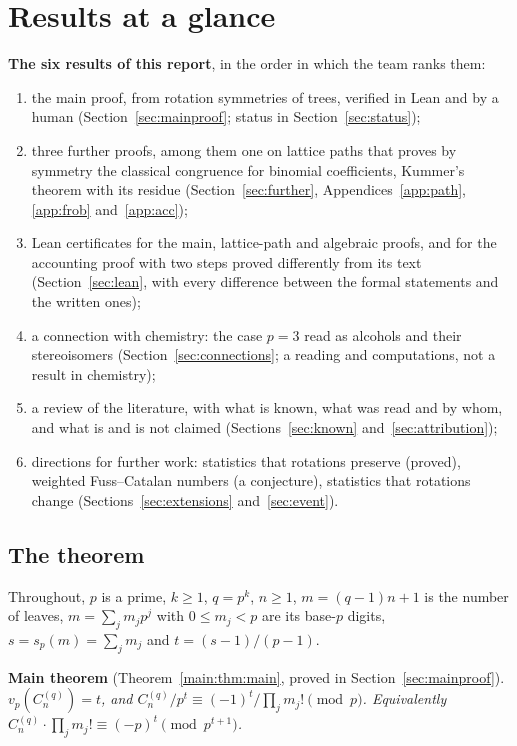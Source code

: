 \documentclass[11pt]{article}
\theoremstyle{definition}
\theoremstyle{remark}
\numberwithin{equation}{section}
\numberwithin{figure}{section}
\begin{document}
\section{Results at a glance}\label{sec:results}
\noindent\textbf{The six results of this report}, in the order in which the team ranks them:
\begin{enumerate}[itemsep=0pt,topsep=2pt]
\item the main proof, from rotation symmetries of trees, verified in Lean and by a human
 (Section~\ref{sec:mainproof}; status in Section~\ref{sec:status});
\item three further proofs, among them one on lattice paths that proves by symmetry the classical congruence
 for binomial coefficients, Kummer's theorem with its residue (Section~\ref{sec:further},
 Appendices~\ref{app:path}, \ref{app:frob} and~\ref{app:acc});
\item Lean certificates for the main, lattice-path and algebraic proofs, and for the accounting proof with two
 steps proved differently from its text (Section~\ref{sec:lean}, with every difference between the formal
 statements and the written ones);
\item a connection with chemistry: the case $p=3$ read as alcohols and their stereoisomers
 (Section~\ref{sec:connections}; a reading and computations, not a result in chemistry);
\item a review of the literature, with what is known, what was read and by whom, and what is and is not claimed
 (Sections~\ref{sec:known} and~\ref{sec:attribution});
\item directions for further work: statistics that rotations preserve (proved), weighted Fuss--Catalan numbers
 (a conjecture), statistics that rotations change (Sections~\ref{sec:extensions} and~\ref{sec:event}).
\end{enumerate}


\subsection{The theorem}
Throughout, $p$ is a prime, $k\ge1$, $q=p^k$, $n\ge1$, $m=(q-1)n+1$ is the number of leaves,
$m=\sum_jm_jp^j$ with $0\le m_j<p$ are its base-$p$ digits, $s=s_p(m)=\sum_jm_j$ and $t=(s-1)/(p-1)$.

\medskip\noindent\textbf{Main theorem} (Theorem~\ref{main:thm:main}, proved in Section~\ref{sec:mainproof}).
\emph{$v_p(C_n^{(q)})=t$, and $C_n^{(q)}/p^t\equiv(-1)^t/\prod_jm_j!\pmod p$. Equivalently
$C_n^{(q)}\cdot\prod_jm_j!\equiv(-p)^t\pmod{p^{t+1}}$.}
\end{document}
